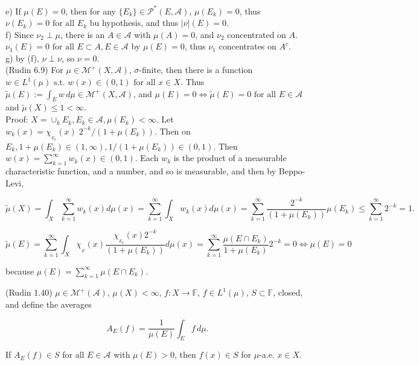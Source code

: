 \documentclass[12pt]{article}
\newcommand{\partset}[1]{ \mathcal{P}^{*}(#1) }
\newcommand{\st}[0]{ \textrm{ s.t. } }
\newcommand{\fall}[0] { \textrm{ for all } }
\newcommand{\scalars}[0] { \mathbb{F}}
\newcommand{\A}[0] { \mathcal{A} }
\newcommand{\M}[0] { \mathcal{M} }
\newcommand{\lrimply}[0] { \Leftrightarrow }
\newcommand{\rarw}[0] { \rightarrow }
\begin{document}
\noindent
e) If $\mu(E) = 0$, then for any $\{ E_k \} \in \partset{E, \A}$, $\mu(E_k) = 0$, thus $\nu(E_k) = 0 \fall E_k$ bu hypothesis, and thus $|\nu|(E) = 0$.   \\

\noindent
f) Since $\nu_2 \perp \mu$, there is an $A \in \A$ with $\mu(A) = 0$, and $\nu_2$ concentrated on $A$. $\nu_1(E) = 0 \fall E \subset A, E \in \A$ by $\mu(E) = 0$, thus $\nu_1$ concentrates on $A^c$.  \\

\noindent
g) by (f), $\nu \perp \nu$, so $\nu = 0$.  \\


(Rudin 6.9) For $\mu \in \M^+(X, \A)$, $\sigma$-finite, then there is a function $w \in L^1(\mu) \st w(x) \in (0,1) \fall x \in X$. Thus $\tilde{\mu}(E) := \int_E w \, d\mu \in \M^+(X, \A)$, and $\mu(E) = 0 \lrimply \tilde{\mu}(E)=0 \fall E \in \A$   and $ \tilde{\mu}(X) \le 1 < \infty$. \\

\noindent
Proof: $X = \cup_k E_k, E_k \in \A, \mu(E_k) < \infty$. Let $w_k(x) = \chi_{_{E_k}}(x) \; 2^{-k}/ (1+\mu(E_k))$. Then on $E_k, 1+\mu(E_k) \in (1,\infty), 1/ (1+\mu(E_k)) \in (0,1)$. Then $w(x) = \sum_{k=1}^\infty w_k(x) \in (0,1)$. Each $w_k$ is the product of a measurable characteristic function, and a number, and so is measurable, and then by Beppo-Levi,

$$
    \tilde{\mu}(X) =  \int_X \sum_{k=1}^\infty w_k(x) d\mu(x) =  \sum_{k=1}^\infty  \int_X w_k(x) d\mu(x) =  \sum_{k=1}^\infty   \frac{2^{-k}}{ (1+\mu(E_k))}     \mu(E_k) \le \sum_{k=1}^\infty 2^{-k} = 1.
$$

$$
    \tilde{\mu}(E) =  \sum_{k=1}^\infty  \int_X \chi_{_{E}}(x) \frac{ \chi_{_{E_k}}(x)  2^{-k}}{ (1+\mu(E_k))} d\mu(x) = \sum_{k=1}^\infty \frac{ \mu(E \cap E_k ) }{ 1+\mu(E_k)} 2^{-k} = 0 \lrimply \mu(E) = 0
$$

\noindent
because $\mu(E) = \sum_{k=1}^\infty \mu(E \cap E_k)$.


\vspace{20pt}

(Rudin 1.40) $\mu \in \M^+(\A)$, $\mu(X) < \infty$, $f: X \rarw \scalars$, $f \in L^1(\mu)$, $S \subset \scalars$, closed, and define the averages

$$
A_E(f) = \frac{1}{\mu(E)}  \int_E f \, d\mu.
$$

\noindent
If $A_E(f) \in S$ for all $E \in \A$ with $\mu(E) > 0$, then $f(x) \in S$ for $\mu$-a.e. $x \in X$. \\
\end{document}
